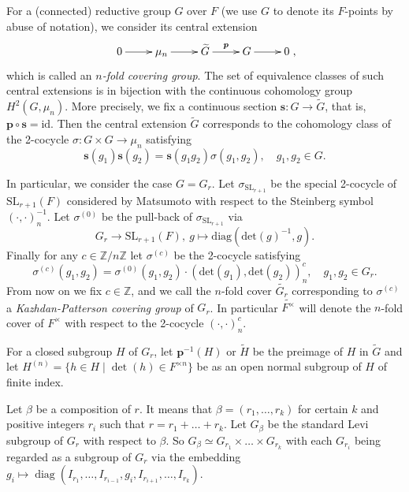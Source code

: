\documentclass{amsart}
\numberwithin{equation}{section}
\newcommand{\mrdet}{\operatorname{det}}
\newcommand{\mrdiag}{\operatorname{diag}}
\newcommand{\mrgcd}{\operatorname{gcd}}
\newcommand{\mbz}{\mathbb{Z}}
\newcommand{\bs}[1]{\boldsymbol{#1}}
\newcommand{\wt}[1]{\widetilde{#1}}
\begin{document}
	For a (connected) reductive group $G$ over $F$ (we use $G$ to denote its $F$-points by abuse of notation), we consider its central extension 
	$$\xymatrix{0 \ar[r] & \mu_{n} \ar[r]^-{} & \wt{G} \ar[r]^-{\bs{p}} & G \ar[r] & 0},$$
	which is called an \emph{$n$-fold covering group}. The set of equivalence classes of such central extensions is in bijection with the continuous cohomology group $H^{2}(G,\mu_{n})$. More precisely, we fix a continuous section $\bs{s}:G\rightarrow \wt{G}$, that is, $\bs{p}\circ\bs{s}=\mathrm{id}$. Then the central extension $\wt{G}$ corresponds to the cohomology class of the 2-cocycle $\sigma:G\times G\rightarrow\mu_{n}$ satisfying
	$$\bs{s}(g_{1})\bs{s}(g_{2})=\bs{s}(g_{1}g_{2})\sigma(g_{1},g_{2}),\quad g_{1},g_{2}\in G.$$
	
	In particular, we consider the case $G=G_{r}$. Let $\sigma_{\mathrm{SL}_{r+1}}$ be the special 2-cocycle of $\mathrm{SL}_{r+1}(F)$ considered by Matsumoto \cite{matsumoto1969sous} with respect to the Steinberg symbol $(\cdot,\cdot)^{-1}_{n}$. Let $\sigma^{(0)}$ be the pull-back of $\sigma_{\mathrm{SL}_{r+1}}$ via $$G_{r}\rightarrow\mathrm{SL}_{r+1}(F),\ g\mapsto\mathrm{diag}(\mathrm{det}(g)^{-1},g).$$ Finally for any $c\in\mbz/n\mbz$ let $\sigma^{(c)}$ be the 2-cocycle satisfying
	$$\sigma^{(c)}(g_{1},g_{2})=\sigma^{(0)}(g_{1},g_{2})\cdot(\mathrm{det}(g_{1}),\mathrm{det}(g_{2}))_{n}^{c},\quad g_{1},g_{2}\in G_{r}.$$
	From now on we fix $c\in\mbz$, and we call the $n$-fold cover $\wt{G_{r}}$ corresponding to $\sigma^{(c)}$ a \emph{Kazhdan-Patterson covering group} of $G_{r}$. In particular $\wt{F^{\times}}$ will denote the $n$-fold cover of $F^{\times}$ with respect to the 2-cocycle $(\cdot,\cdot)_{n}^{c}$. 
	
	
	For a closed subgroup $H$ of $G_{r}$, let $\bs{p}^{-1}(H)$ or $\wt{H}$ be the preimage of $H$ in $\wt{G}$ and let $H^{(n)}=\{h\in H\mid \mrdet(h)\in F^{\times n}\}$ be as an open normal subgroup of $H$ of finite index.
	
	Let $\beta$ be a composition of $r$. It means that $\beta=(r_{1},\dots,r_{k})$ for certain $k$ and positive integers $r_{i}$ such that $r=r_{1}+\dots+ r_{k}$. Let $G_{\beta}$ be the standard Levi subgroup of $G_{r}$ with respect to $\beta$. So $G_{\beta}\simeq G_{r_{1}}\times\dots\times G_{r_{k}}$ with each $G_{r_{i}}$ being regarded as a subgroup of $G_{r}$ via the embedding $g_{i}\mapsto\mrdiag(I_{r_{1}},\dots,I_{r_{i-1}},g_{i},I_{r_{i+1}},\dots, I_{r_{k}})$. 
	
\end{document}
